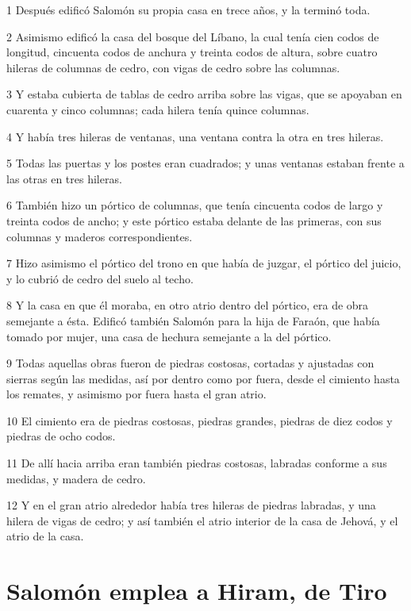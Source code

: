 \par 1 Después edificó Salomón su propia casa en trece años, y la terminó toda.
\par 2 Asimismo edificó la casa del bosque del Líbano, la cual tenía cien codos   de longitud, cincuenta codos de anchura y treinta codos de altura, sobre cuatro hileras de columnas de cedro, con vigas de cedro sobre las columnas.
\par 3 Y estaba cubierta de tablas de cedro arriba sobre las vigas, que se apoyaban en cuarenta y cinco columnas; cada hilera tenía quince columnas.
\par 4 Y había tres hileras de ventanas, una ventana contra la otra en tres hileras.
\par 5 Todas las puertas y los postes eran cuadrados; y unas ventanas estaban frente a las otras en tres hileras.
\par 6 También hizo un pórtico de columnas, que tenía cincuenta codos   de largo y treinta codos de ancho; y este pórtico estaba delante de las primeras, con sus columnas y maderos correspondientes.
\par 7 Hizo asimismo el pórtico del trono en que había de juzgar, el pórtico del juicio, y lo cubrió de cedro del suelo al techo.
\par 8 Y la casa en que él moraba, en otro atrio dentro del pórtico, era de obra semejante a ésta. Edificó también Salomón para la hija de Faraón, que había tomado por mujer, una casa de hechura semejante a la del pórtico.
\par 9 Todas aquellas obras fueron de piedras costosas, cortadas y ajustadas con sierras según las medidas, así por dentro como por fuera, desde el cimiento hasta los remates, y asimismo por fuera hasta el gran atrio.
\par 10 El cimiento era de piedras costosas, piedras grandes, piedras de diez codos   y piedras de ocho codos.
\par 11 De allí hacia arriba eran también piedras costosas, labradas conforme a sus medidas, y madera de cedro.
\par 12 Y en el gran atrio alrededor había tres hileras de piedras labradas, y una hilera de vigas de cedro; y así también el atrio interior de la casa de Jehová, y el atrio de la casa.

\section*{Salomón emplea a Hiram, de Tiro}

